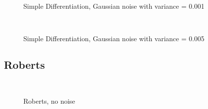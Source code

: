 \documentclass[10pt,a4paper]{article}
\begin{document}
\begin{figure}
  \centering
     \\
  \caption{Simple Differentiation, Gaussian noise with variance = 0.001}
  \label{fig:sd_001}
\end{figure}

\begin{figure}
  \centering
     \\
  \caption{Simple Differentiation, Gaussian noise with variance = 0.005}
  \label{fig:sd_005}
\end{figure}

\subsection{Roberts}
\begin{figure}
  \centering
     \\
  \caption{Roberts, no noise}
  \label{fig:robert_no_noise}
\end{figure}
\end{document}
